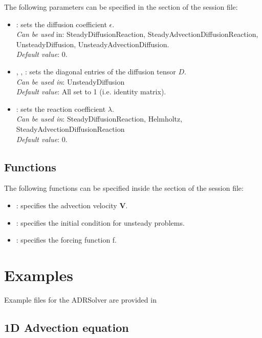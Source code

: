 The following parameters can be specified in the  section of
the session file:
\begin{itemize}
\item {}: sets the diffusion coefficient $\epsilon$.\\ 
\textit{Can be used} in: SteadyDiffusionReaction, SteadyAdvectionDiffusionReaction, UnsteadyDiffusion, UnsteadyAdvectionDiffusion. \\
\textit{Default value}: 0.
\item  {}, , : sets the diagonal entries of the
diffusion tensor $D$. \\
\textit{Can be used in}: UnsteadyDiffusion \\
\textit{Default value}: All set to 1 (i.e. identity matrix). 
\item  {}: sets the reaction coefficient  $\lambda$. \\
\textit{Can be used in}: SteadyDiffusionReaction, Helmholtz, SteadyAdvectionDiffusionReaction\\
\textit{Default value}: 0.
\end{itemize}

\subsection{Functions}

The following functions can be specified inside the  section
of the session file:

\begin{itemize}
\item {}: specifies the advection velocity $\mathbf{V}$.
\item {}: specifies the initial condition for unsteady problems.
\item {}: specifies the forcing function f.
\end{itemize}

\section{Examples}
Example files for the ADRSolver are provided in

\subsection{1D Advection equation}


